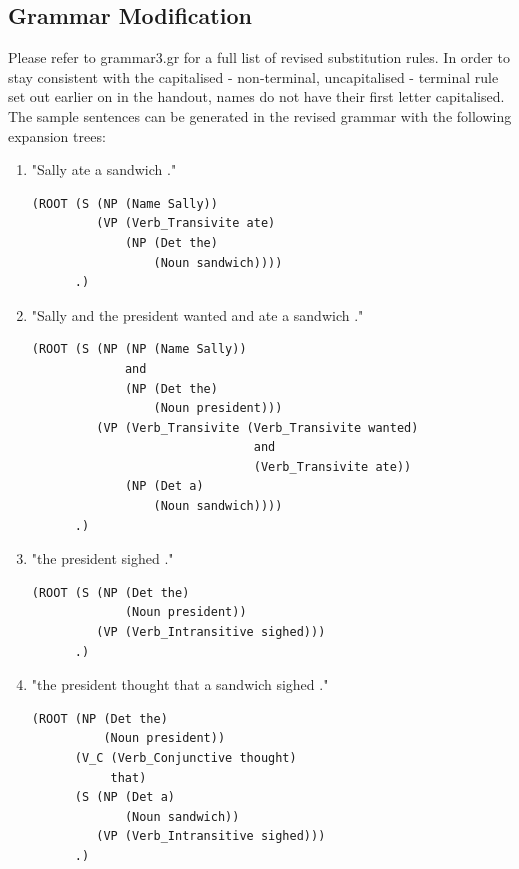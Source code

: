 \documentclass[11pt]{article}
\begin{document}
\subsection{Grammar Modification}

\noindent Please refer to grammar3.gr for a full list of revised substitution rules. In order to stay consistent with the capitalised - non-terminal, uncapitalised - terminal rule set out earlier on in the handout, names do not have their first letter capitalised. The sample sentences can be generated in the revised grammar with the following expansion trees:

\begin{enumerate}[label=(\arabic*)]
      \item "Sally ate a sandwich ."

            \begin{verbatim}
(ROOT (S (NP (Name Sally))
         (VP (Verb_Transivite ate)
             (NP (Det the)
                 (Noun sandwich))))
      .)
      \end{verbatim}

      \item "Sally and the president wanted and ate a sandwich ."

            \begin{verbatim}
(ROOT (S (NP (NP (Name Sally))
             and
             (NP (Det the)
                 (Noun president)))
         (VP (Verb_Transivite (Verb_Transivite wanted)
                               and
                               (Verb_Transivite ate))
             (NP (Det a)
                 (Noun sandwich))))
      .)
\end{verbatim}

      \item "the president sighed ."

            \begin{verbatim}
(ROOT (S (NP (Det the)
             (Noun president))
         (VP (Verb_Intransitive sighed)))
      .)
\end{verbatim}

      \item "the president thought that a sandwich sighed ."

            \begin{verbatim}
(ROOT (NP (Det the)
          (Noun president))
      (V_C (Verb_Conjunctive thought)
           that)
      (S (NP (Det a)
             (Noun sandwich))
         (VP (Verb_Intransitive sighed)))
      .)
\end{verbatim}


\end{enumerate}
\end{document}
